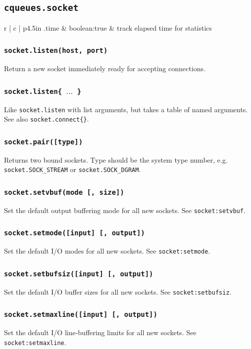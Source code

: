 \documentclass[11pt, oneside]{memoir}
\newcommand*{\fn}[1]{\texttt{#1}\xspace}
\newcounter{toccols}
\newenvironment{Module}[1]{
	\subsection{\texttt{#1}}
	\addtocontents{toc}{
		\protect\begin{multicols}{\value{toccols}}
	}
}{
	\addtocontents{toc}{\protect\end{multicols}}
}
\begin{document}
\begin{Module}{cqueues.socket}
\begin{ctabular}{r | c | p{4.5in}}
.time & boolean:true & track elapsed time for statistics \\
\end{ctabular}

\subsubsection[\fn{socket.listen}]{\fn{socket.listen(host, port)}}
	Return a new socket immediately ready for accepting connections.

\subsubsection[\fn{socket.listen}]{\fn{socket.listen\{ $\ldots$ \}}}
	Like \fn{socket.listen} with list arguments, but takes a table of named arguments. See also \fn{socket.connect\{\}}.

\subsubsection[\fn{socket.pair}]{\fn{socket.pair([type])}}
Returns two bound sockets. Type should be the system type number, e.g. \fn{socket.SOCK\_STREAM} or \fn{socket.SOCK\_DGRAM}.

\subsubsection[\fn{socket.setvbuf}]{\fn{socket.setvbuf(mode [, size])}}
	Set the default output buffering mode for all new sockets. See \fn{socket:setvbuf}.

\subsubsection[\fn{socket.setmode}]{\fn{socket.setmode([input] [, output])}}
	Set the default I/O modes for all new sockets. See \fn{socket:setmode}.

\subsubsection[\fn{socket.setbufsiz}]{\fn{socket.setbufsiz([input] [, output])}}
	Set the default I/O buffer sizes for all new sockets. See \fn{socket:setbufsiz}.

\subsubsection[\fn{socket.setmaxline}]{\fn{socket.setmaxline([input] [, output])}}
	Set the default I/O line-buffering limits for all new sockets. See \fn{socket:setmaxline}.


\end{Module}
\end{document}
